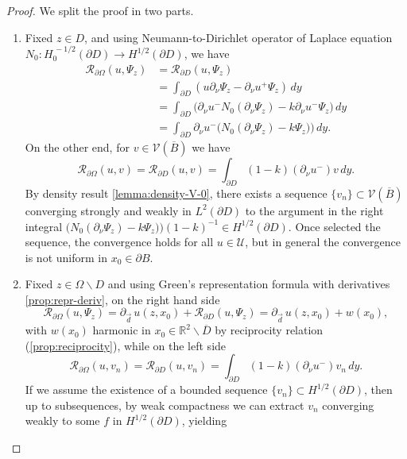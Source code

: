 \documentclass[10pt, a4paper, twoside, openright]{book}
\theoremstyle{definition}
\theoremstyle{plain}
\theoremstyle{plain}
\theoremstyle{plain}
\theoremstyle{plain}
\theoremstyle{plain}
\theoremstyle{plain}
\theoremstyle{plain}
\theoremstyle{plain}
\begin{document}
\begin{proof}
We split the proof in two parts.
 \begin{enumerate}
  \item Fixed $z \in D$, and using Neumann-to-Dirichlet operator of Laplace equation ${N_0}:H^{\,-1/2}_0(\partial D)\to H^{1/2}(\partial D)$,
    we have
    \begin{align}
    \mathcal{R}_{\partial \Omega}(u,\Psi_z) &= \mathcal{R}_{\partial D}(u,\Psi_z) \\
    &= \int_{\partial D}(u\partial_\nu\Psi_z - \partial_\nu u^+ \Psi_z) \,dy\\
    &= \int_{\partial D}\bigl(\partial_\nu u^- {N_0}(\partial_\nu\Psi_z) - k \partial_\nu u^- \Psi_z\bigr) \,dy \\
    &= \int_{\partial D}\partial_\nu u^-\Big( {N_0}(\partial_\nu\Psi_z) - k \Psi_z)\Big) \,dy.
    \end{align}
  On the other end, for $v\in\mathcal{V}(\overline{B})$ we have
  \begin{equation}
   \mathcal{R}_{\partial \Omega}(u,v) = \mathcal{R}_{\partial D}(u,v) = \int_{\partial D}(1-k)(\partial_\nu u^- )v\,dy.
  \end{equation}
  By density result \ref{lemma:density-V-0}, there exists a sequence $\{v_n\}\subset \mathcal{V}(\overline{B})$ converging strongly and weakly in $L^2(\partial D)$ to the argument in the right integral $\bigl( {N_0}(\partial_\nu\Psi_z) - k \Psi_z)\bigr)(1-k)^{-1}\in H^{1/2}(\partial D)$.
  Once selected the sequence, the convergence holds for all $u\in\mathcal{U}$, but in general the convergence is not uniform in $x_0\in \partial B$.
  \item Fixed $z \in \Omega\backslash D$ and using Green's representation formula with derivatives \eqref{prop:repr-deriv}, on the right hand side
  \begin{equation}
   \mathcal{R}_{\partial \Omega}(u,\Psi_z) = \partial_{\vec{d}}\,u(z,x_0) + \mathcal{R}_{\partial D}(u,\Psi_z) = \partial_{\vec{d}}\,u(z,x_0) + w(x_0),
  \end{equation}
  with $w(x_0)$ harmonic in $x_0 \in \mathbb{R}^2\backslash \overline{D}$ by reciprocity relation (\ref{prop:reciprocity}), while on the left side
  \begin{equation}
   \mathcal{R}_{\partial \Omega}(u,v_n) = \mathcal{R}_{\partial D}(u,v_n) = \int_{\partial D}(1-k)(\partial_\nu u^- )v_n\,dy.
  \end{equation}
  If we assume the existence of a bounded sequence $\{v_n\} \subset H^{1/2}(\partial D)$, then up to subsequences, by weak compactness we can extract $v_n$ converging weakly to some $f$ in $H^{1/2}(\partial D)$, yielding

\end{enumerate}
\end{proof}
\end{document}
